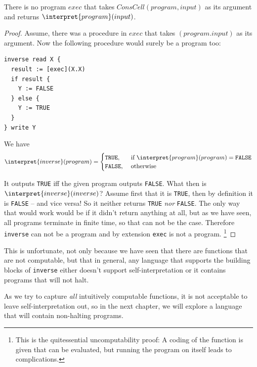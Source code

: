 \begin{theorem}
	There is no \FOR program $exec$ that takes $ConsCell(program, input)$ as its 
	argument and returns $\interpret{program}(input)$.
\end{theorem}
\begin{proof}
Assume, there was a procedure in \FOR $exec$ that takes $(program.input)$ as 
its argument. Now the following procedure would surely be a \FOR program too:

\begin{verbatim}
inverse read X {
  result := [exec](X.X)
  if result {
    Y := FALSE
  } else {
    Y := TRUE
  }
} write Y
\end{verbatim}

We have 
\[ \interpret{inverse}(program) = \begin{cases}
		\mathtt{TRUE}, &\text{ if }\interpret{program}(program) = \mathtt{FALSE} \\
		\mathtt{FALSE}, &\text{ otherwise }
	\end{cases} \]

It outputs {\tt TRUE} iff the given program outputs {\tt FALSE}. What then 
is $\interpret{inverse}(inverse)$? Assume first that it is 
{\tt TRUE}, then by definition it is {\tt FALSE} -- and vice versa! So it 
neither returns {\tt TRUE} \emph{nor} {\tt FALSE}. The only way that would 
work would be if it didn't return anything at all, but as we have seen, all 
\FOR programs terminate in finite time, so that can not be the case. 
Therefore {\tt inverse} can not be a \FOR program and by extension {\tt exec} 
is not a \FOR program. 
\footnote{This is the quitessential uncomputability 
	proof: A coding of the function is given that can be evaluated, but running 
  the program on itself leads to complications.}
\end{proof}

This is unfortunate, not only because we have seen that there are functions 
that are not \FOR computable, but that in general, any language that supports 
the building blocks of {\tt inverse} either doesn't support 
self-interpretation or it contains programs that will not halt.

As we try to capture \emph{all} intuitively computable functions, it is not 
acceptable to leave self-interpretation out, so in the next chapter, we will 
explore a language that will contain non-halting programs.

